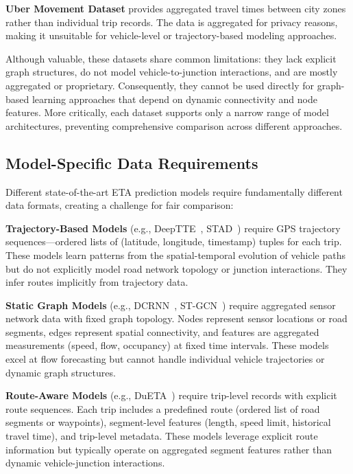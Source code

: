 \textbf{Uber Movement Dataset} provides aggregated travel times between city zones rather than individual trip records. The data is aggregated for privacy reasons, making it unsuitable for vehicle-level or trajectory-based modeling approaches.

Although valuable, these datasets share common limitations: they lack explicit graph structures, do not model vehicle-to-junction interactions, and are mostly aggregated or proprietary. Consequently, they cannot be used directly for graph-based learning approaches that depend on dynamic connectivity and node features. More critically, each dataset supports only a narrow range of model architectures, preventing comprehensive comparison across different approaches.

\subsection{Model-Specific Data Requirements}

Different state-of-the-art ETA prediction models require fundamentally different data formats, creating a challenge for fair comparison:

\textbf{Trajectory-Based Models} (e.g., DeepTTE~\cite{deepTTE2018}, STAD~\cite{abbar2020stad}) require GPS trajectory sequences—ordered lists of (latitude, longitude, timestamp) tuples for each trip. These models learn patterns from the spatial-temporal evolution of vehicle paths but do not explicitly model road network topology or junction interactions. They infer routes implicitly from trajectory data.

\textbf{Static Graph Models} (e.g., DCRNN~\cite{dcrnn2018}, ST-GCN~\cite{yu2018stgcn}) require aggregated sensor network data with fixed graph topology. Nodes represent sensor locations or road segments, edges represent spatial connectivity, and features are aggregated measurements (speed, flow, occupancy) at fixed time intervals. These models excel at flow forecasting but cannot handle individual vehicle trajectories or dynamic graph structures.

\textbf{Route-Aware Models} (e.g., DuETA~\cite{dueta2023}) require trip-level records with explicit route sequences. Each trip includes a predefined route (ordered list of road segments or waypoints), segment-level features (length, speed limit, historical travel time), and trip-level metadata. These models leverage explicit route information but typically operate on aggregated segment features rather than dynamic vehicle-junction interactions.

